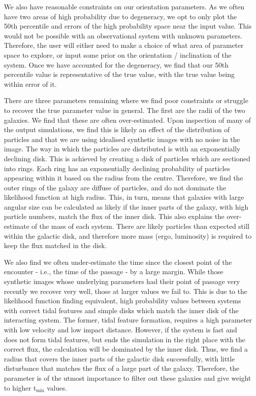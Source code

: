 We also have reasonable constraints on our orientation parameters. As we often have two areas of high probability due to degeneracy, we opt to only plot the 50th percentile and errors of the high probability space near the input value. This would not be possible with an observational system with unknown parameters. Therefore, the user will either need to make a choice of what area of parameter space to explore, or input some prior on the orientation / inclination of the system. Once we have accounted for the degeneracy, we find that our 50th percentile value is representative of the true value, with the true value being within error of it. 

There are three parameters remaining where we find poor constraints or struggle to recover the true parameter value in general. The first are the radii of the two galaxies. We find that these are often over-estimated. Upon inspection of many of the output simulations, we find this is likely an effect of the distribution of particles and that we are using idealised synthetic images with no noise in the image. The way in which the particles are distributed is with an exponentially declining disk. This is achieved by creating a disk of particles which are sectioned into rings. Each ring has an exponentially declining probability of particles appearing within it based on the radius from the centre. Therefore, we find the outer rings of the galaxy are diffuse of particles, and do not dominate the likelihood function at high radius. This, in turn, means that galaxies with large angular size can be calculated as likely if the inner parts of the galaxy, with high particle numbers, match the flux of the inner disk. This also explains the over-estimate of the mass of each system. There are likely \DIFdelbegin {}\DIFdelend \DIFaddbegin {}\DIFaddend particles than expected still within the galactic disk, and therefore more mass (ergo, luminosity) is required to keep the flux matched in the disk.

We also find we often under-estimate the time since the closest point of the encounter - i.e., the time of the passage - by a large margin. While those synthetic images whose underlying parameters had their point of passage very recently we recover very well, those at larger values we fail to. This is due to the likelihood function finding equivalent, high probability values between systems with correct tidal features and simple disks which match the inner disk of the interacting system. The former, tidal feature formation, requires a high \DIFdelbegin \DIFdel{$\beta$ }\DIFdelend \DIFaddbegin \DIFadd{$\gamma$ }\DIFaddend parameter with low velocity and low impact distance. However, if the system is fast and does not form tidal features, but ends the simulation in the right place with the correct flux, the calculation will be dominated by the inner disk. Thus, we find a radius that covers the inner parts of the galactic disk successfully, with little disturbance that matches the flux of a large part of the galaxy. Therefore, the \DIFdelbegin \DIFdel{$\beta$ }\DIFdelend \DIFaddbegin \DIFadd{$\gamma$ }\DIFaddend parameter is of the utmost importance to filter out these galaxies and give weight to higher t$_{\mathrm{min}}$ values.

